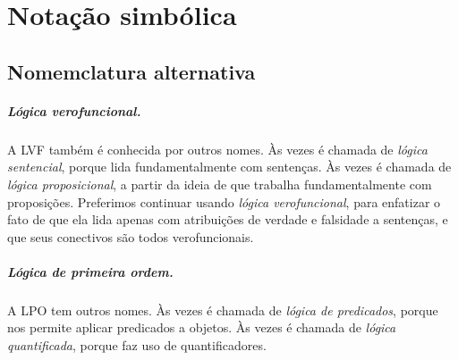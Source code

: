 
\chapter{Notação simbólica}
\label{app.notation}

\section{Nomemclatura alternativa}


\paragraph{Lógica verofuncional.} A LVF também é conhecida por outros nomes. Às vezes é chamada de \emph{lógica sentencial}, porque lida fundamentalmente com sentenças. Às vezes é chamada de \emph{lógica proposicional}, a partir da ideia de que trabalha fundamentalmente com proposições. Preferimos continuar usando \emph{lógica verofuncional}, para enfatizar o fato de que ela lida apenas com atribuições de verdade e falsidade a sentenças, e que seus conectivos são todos verofuncionais.


\paragraph{Lógica de primeira ordem.} A LPO tem outros nomes. Às vezes é chamada de \emph{lógica de predicados}, porque nos permite aplicar predicados a objetos. Às vezes é chamada de \emph{lógica quantificada}, porque faz uso de quantificadores. 

